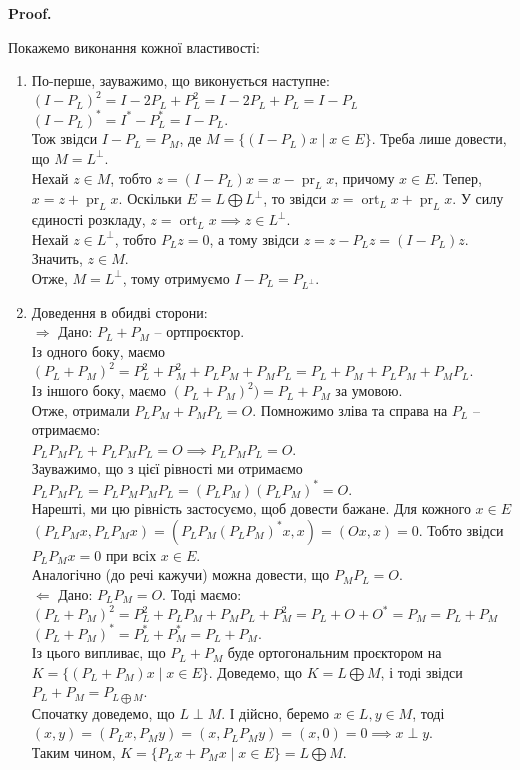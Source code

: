 \documentclass[a4paper, 10pt]{article}
\makeatletter
\def\rightproof{$\boxed{\Rightarrow}$ }
\def\leftproof{$\boxed{\Leftarrow}$ }
\theoremstyle{theoremdd}
\DeclareMathOperator{\ort}{ort}
\DeclareMathOperator{\pr}{pr}
\renewenvironment{proof}[1][Proof.\\]{\par
\pushQED{\hfill \qed}%
\normalfont \topsep6\p@\@plus6\p@\relax
\trivlist
\item\relax
{\bfseries
#1\@addpunct{.}}\hspace\labelsep\ignorespaces
}{%
\popQED\endtrivlist\@endpefalse
}
\makeatother
\begin{document}
\begin{proof}
Покажемо виконання кожної властивості:
\begin{enumerate}[wide=0pt,label={\arabic*)}]
\item По-перше, зауважимо, що виконується наступне:\\
$(I - P_L)^2 = I - 2P_L + P_L^2 = I - 2P_L + P_L = I - P_L$\\
$(I - P_L)^* = I^* - P_L^* = I - P_L$.\\
Тож звідси $I - P_L = P_M$, де $M = \{ (I-P_L)x \mid x \in E \}$. Треба лише довести, що $M = L^\perp$.\\
Нехай $z \in M$, тобто $z = (I-P_L)x = x - \pr_L x$, причому $x \in E$. Тепер, $x = z + \pr_L x$. Оскільки $E = L \bigoplus L^{\perp}$, то звідси $x = \ort_L x + \pr_L x$. У силу єдиності розкладу, $z = \ort_L x \implies z \in L^\perp$.\\
Нехай $z \in L^\perp$, тобто $P_L z = 0$, а тому звідси $z = z - P_L z = (I-P_L)z$. Значить, $z \in M$.\\
Отже, $M = L^\perp$, тому отримуємо $I - P_L = P_{L^\perp}$.

\item Доведення в обидві сторони:\\
\rightproof Дано: $P_L + P_M$ -- ортпроєктор.\\
Із одного боку, маємо $(P_L + P_M)^2 = P_L^2 + P_M^2 + P_L P_M + P_M P_L = P_L + P_M + P_L P_M + P_M P_L$.\\
Із іншого боку, маємо $(P_L + P_M)^2) = P_L + P_M$ за умовою.\\
Отже, отримали $P_L P_M + P_M P_L = O$. Помножимо зліва та справа на $P_L$ -- отримаємо:\\
$P_L P_M P_L + P_L P_M P_L = O \implies P_L P_M P_L = O$.\\
Зауважимо, що з цієї рівності ми отримаємо $P_L P_M P_L = P_L P_M P_M P_L = (P_L P_M) (P_L P_M)^* = O$.\\
Нарешті, ми цю рівність застосуємо, щоб довести бажане. Для кожного $x \in E$\\
$(P_L P_M x, P_L P_M x) = (P_L P_M (P_L P_M)^* x, x) = (Ox,x) = 0$. Тобто звідси $P_LP_M x = 0$ при всіх $x \in E$.\\
Аналогічно (до речі кажучи) можна довести, що $P_M P_L = O$.
\bigskip \\
\leftproof Дано: $P_LP_M = O$. Тоді маємо:\\
$(P_L + P_M)^2 = P_L^2 + P_L P_M + P_M P_L + P_M^2 = P_L + O + O^* = P_M = P_L + P_M$\\
$(P_L + P_M)^* = P_L^* + P_M^* = P_L + P_M$.\\
Із цього випливає, що $P_L + P_M$ буде ортогональним проєктором на $K = \{ (P_L + P_M)x \mid x \in E\}$. Доведемо, що $K = L \bigoplus M$, і тоді звідси $P_L + P_M = P_{L \bigoplus M}$.\\
Спочатку доведемо, що $L \perp M$. І дійсно, беремо $x \in L, y \in M$, тоді\\
$(x,y) = (P_L x, P_M y) = (x, P_L P_M y) = (x,0) = 0 \implies x \perp y$.\\
Таким чином, $K = \{P_Lx + P_Mx \mid x \in E\} = L \bigoplus M$.


\end{enumerate}
\end{proof}
\end{document}

